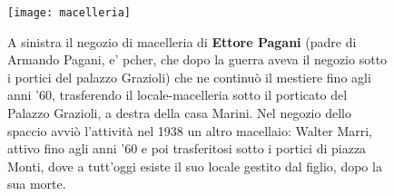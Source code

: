 \begin{figure}[htb]
    \centering
    \texttt{[image: macelleria]}
    \caption*{A sinistra il negozio di macelleria di \textbf{Ettore Pagani} (padre di Armando Pagani, e' pcher, che dopo la guerra aveva il negozio sotto i portici del palazzo Grazioli) che ne continuò il mestiere fino agli anni '60, trasferendo il locale-macelleria sotto il porticato del Palazzo Grazioli, a destra della casa Marini. Nel negozio dello spaccio avviò l'attività nel 1938 un altro macellaio: Walter Marri, attivo fino agli anni '60 e poi trasferitosi sotto i portici di piazza Monti, dove a tutt'oggi esiste il suo locale gestito dal figlio, dopo la sua morte.\label{fig:macelleria}}
\end{figure}






































%
